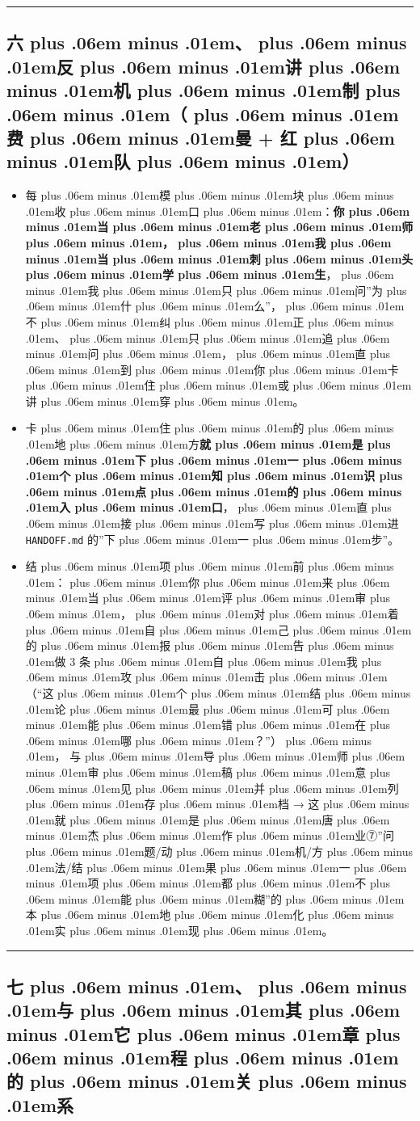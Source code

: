 \documentclass[
]{article}
\newcommand{\passthrough}[1]{#1}
\providecommand{\tightlist}{%
  \setlength{\itemsep}{0pt}\setlength{\parskip}{0pt}}
\def\zh#1{{\zhfont #1}}
\def\sym#1{{\symfont #1}}
\def\zhglue{\hskip0pt plus .06em minus .01em}
\begin{document}
\begin{center}\rule{0.5\linewidth}{0.5pt}\end{center}

\subsection{\zh{六\zhglue 、\zhglue 反\zhglue 讲\zhglue 机\zhglue 制\zhglue （\zhglue 费\zhglue 曼} + \zh{红\zhglue 队\zhglue ）}}\label{ux516dux53cdux8bb2ux673aux5236ux8d39ux66fc-ux7ea2ux961f}

\begin{itemize}
\tightlist
\item
  \zh{每\zhglue 模\zhglue 块\zhglue 收\zhglue 口\zhglue ：}\textbf{\zh{你\zhglue 当\zhglue 老\zhglue 师\zhglue ，\zhglue 我\zhglue 当\zhglue 刺\zhglue 头\zhglue 学\zhglue 生}}\zh{，\zhglue 我\zhglue 只\zhglue 问}''\zh{为\zhglue 什\zhglue 么}''\zh{，\zhglue 不\zhglue 纠\zhglue 正\zhglue 、\zhglue 只\zhglue 追\zhglue 问\zhglue ，\zhglue 直\zhglue 到\zhglue 你\zhglue 卡\zhglue 住\zhglue 或\zhglue 讲\zhglue 穿\zhglue 。}
\item
  \zh{卡\zhglue 住\zhglue 的\zhglue 地\zhglue 方}\textbf{\zh{就\zhglue 是\zhglue 下\zhglue 一\zhglue 个\zhglue 知\zhglue 识\zhglue 点\zhglue 的\zhglue 入\zhglue 口}}\zh{，\zhglue 直\zhglue 接\zhglue 写\zhglue 进} \passthrough{\lstinline!HANDOFF.md!} \zh{的}''\zh{下\zhglue 一\zhglue 步}''\zh{。}
\item
  \zh{结\zhglue 项\zhglue 前\zhglue ：\zhglue 你\zhglue 来\zhglue 当\zhglue 评\zhglue 审\zhglue ，\zhglue 对\zhglue 着\zhglue 自\zhglue 己\zhglue 的\zhglue 报\zhglue 告\zhglue 做} 3 \zh{条\zhglue 自\zhglue 我\zhglue 攻\zhglue 击\zhglue （}``\zh{这\zhglue 个\zhglue 结\zhglue 论\zhglue 最\zhglue 可\zhglue 能\zhglue 错\zhglue 在\zhglue 哪\zhglue ？}''\zh{）\zhglue ，} \zh{与\zhglue 导\zhglue 师\zhglue 审\zhglue 稿\zhglue 意\zhglue 见\zhglue 并\zhglue 列\zhglue 存\zhglue 档} \sym{→} \zh{这\zhglue 就\zhglue 是\zhglue 唐\zhglue 杰\zhglue 作\zhglue 业}\sym{⑦}''\zh{问\zhglue 题}/\zh{动\zhglue 机}/\zh{方\zhglue 法}/\zh{结\zhglue 果\zhglue 一\zhglue 项\zhglue 都\zhglue 不\zhglue 能\zhglue 糊}''\zh{的\zhglue 本\zhglue 地\zhglue 化\zhglue 实\zhglue 现\zhglue 。}
\end{itemize}

\begin{center}\rule{0.5\linewidth}{0.5pt}\end{center}

\subsection{\zh{七\zhglue 、\zhglue 与\zhglue 其\zhglue 它\zhglue 章\zhglue 程\zhglue 的\zhglue 关\zhglue 系}}\label{ux4e03ux4e0eux5176ux5b83ux7ae0ux7a0bux7684ux5173ux7cfb}
\end{document}
